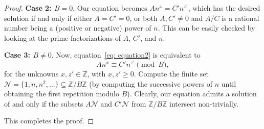 \documentclass[10pt,a4paper]{amsart}
\newcommand\ZZ{\mathbb{Z}}
\begin{document}
\begin{proof}
\textbf{Case 2: $B=0$}. Our equation becomes $An^x=C' n^{z'}$, which has the desired solution if and only if either $A=C'=0$, or both $A,C'\neq 0$ and $A/C$ is a rational number being a (positive or negative) power of $n$. This can be easily checked by looking at the prime factorizations of $A$, $C'$, and $n$.

\textbf{Case 3: $B\neq 0$}. Now, equation~\eqref{eq: equation2} is equivalent to 
 $$
An^x \equiv C'n^{z'} \pmod{B},
 $$
for the unknowns $x,z'\in \ZZ$, with $x,z'\geq 0$. Compute the finite set $\mathcal{N}=\{1,n,n^2, \ldots \}\subseteq \ZZ/B\ZZ$ (by computing the successive powers of $n$ until obtaining the first repetition modulo $B$). Clearly, our equation admits a solution of and only if the subsets $A\mathcal{N}$ and $C'\mathcal{N}$ from $\ZZ/B\ZZ$ intersect non-trivially. 

This completes the proof.
\end{proof}
\end{document}
